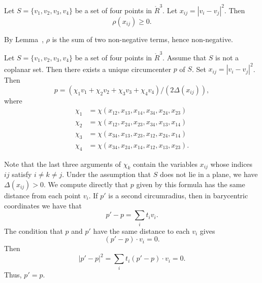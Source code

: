 \begin{tarskidata}
\begin{tarski}
\begin{lemma}
Let $S=\{v_1,v_2,v_3,v_4\}$ be
a set of four points in $\ring{R}^3$.  Let
$x_{ij}=|v_i-v_j|^2$.  Then
	$$\rho(x_{ij})\ge 0.$$
\end{lemma}

\begin{proved} By Lemma~,
$\rho$ is the sum of two non-negative terms, hence
non-negative.
\swallowed\end{proved}
\end{tarski}





\begin{tarski}

\begin{lemma}
Let $S=\{v_1,v_2,v_3,v_4\}$ be a set of four points in $\ring{R}^3$.
Assume that $S$ is not a coplanar set.  
Then there exists a unique circumcenter $p$
of $S$.  Set $x_{ij} = |v_i-v_j|^2$.
Then 
    $$
    p = (\chi_1 v_1 + \chi_2 v_2 + \chi_3 v_3 + \chi_4
    v_4)/(2\Delta(x_{ij})),
    $$
where
    $$
    \begin{array}{lll}
    \chi_1 &= \chi(x_{12},x_{13},x_{14},x_{34},x_{24},x_{23})\\
    \chi_2 &= \chi(x_{12},x_{24},x_{23},x_{34},x_{13},x_{14})\\
    \chi_3 &= \chi(x_{34},x_{13},x_{23},x_{12},x_{24},x_{14})\\
    \chi_4 &= \chi(x_{34},x_{24},x_{14},x_{12},x_{13},x_{23}).
    \end{array}
    $$
\end{lemma}


\begin{proved}
Note that the last three arguments of $\chi_k$ 
contain the variables $x_{ij}$ whose
indices $ij$ satisfy $i\ne k\ne j$.
Under the assumption that $S$ does not lie
in a plane, we have $\Delta(x_{ij})>0$. 
We compute directly that $p$ given by this
formula has the same distance from each point
$v_i$.  If $p'$ is a second circumradius, then in 
barycentric coordinates we have that
  $$p'-p = \sum_i t_i v_i.$$
The condition that $p$ and $p'$ have the same distance to each $v_i$
gives
  $$(p'-p)\cdot v_i=0.$$
Then $$|p'-p|^2 = \sum_it_i (p'-p)\cdot v_i = 0.$$  
Thus, $p'=p$.
\swallowed\end{proved}
\end{tarski}






\end{tarskidata}
